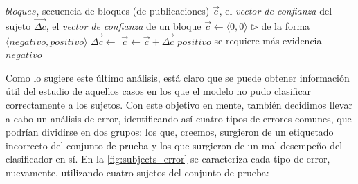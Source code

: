 \begin{algorithm}[t!]
\small
\caption{\small
Algoritmo de clasificación anticipada utilizado por SS3$^\Delta$.
Donde ($bloque$) es en realidad un alias de  ($bloque$, 4) (dado en \autoref{alg:classification}).
}
  \label{alg:classification_ss3slope}
  \begin{algorithmic}[h]
  \Statex
      \State \Input $bloques$, secuencia de bloques (de publicaciones)
      \State \LocalVariables $\overrightarrow{c}$, el \emph{vector de confianza} del sujeto
      \State \localvarsindent $\overrightarrow{\Delta c}$, el \emph{vector de confianza} de un bloque
      \State $\overrightarrow{c} \gets \langle 0, 0\rangle$ $\rhd$ de la forma $\langle negativo, positivo\rangle$
          \State $\overrightarrow{\Delta c} \gets $
          \State $\overrightarrow{c} \gets \overrightarrow{c} + \overrightarrow{\Delta c}$ 
              \State \Return $positivo$ 
          \Else
              \State se requiere más evidencia
          \EndIf
      \EndFor
      \State \Return $negativo$ 
  \EndFunction
  \end{algorithmic}
\end{algorithm}

Como lo sugiere este último análisis, está claro que se puede obtener información útil del estudio de aquellos casos en los que el modelo no pudo clasificar correctamente a los sujetos. Con este objetivo en mente, también decidimos llevar a cabo un análisis de error, identificando así cuatro tipos de errores comunes, que podrían dividirse en dos grupos: los que, creemos, surgieron de un etiquetado incorrecto del conjunto de prueba y los que surgieron de un mal desempeño del clasificador en sí. En la \autoref{fig:subjects_error} se caracteriza cada tipo de error, nuevamente, utilizando cuatro sujetos del conjunto de prueba:

